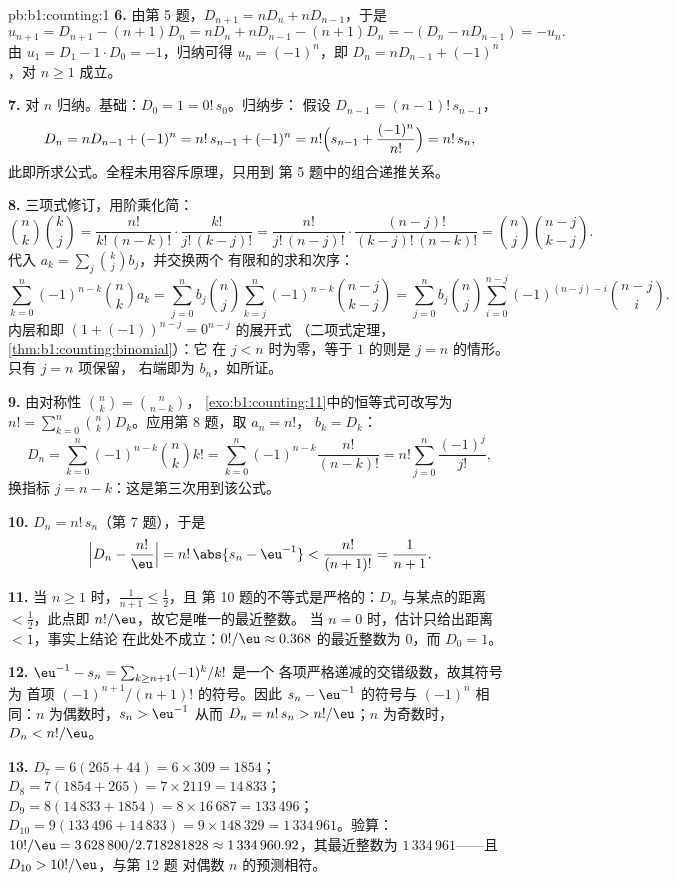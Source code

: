 \begin{solution}{pb:b1:counting:1}
\textbf{6.} 由第 5 题，$D_{n+1} = nD_n + nD_{n-1}$，于是
\[
u_{n+1} = D_{n+1} - (n+1)D_n = nD_n + nD_{n-1} - (n+1)D_n
= -(D_n - nD_{n-1}) = -u_n .
\]
由 $u_1 = D_1 - 1 \cdot D_0 = -1$，归纳可得 $u_n =
(-1)^n$，即 $D_n = nD_{n-1} + (-1)^n$，对 $n \geq 1$ 成立。

\textbf{7.} 对 $n$ 归纳。基础：$D_0 = 1 = 0!\,s_0$。归纳步：
假设 $D_{n-1} = (n-1)!\,s_{n-1}$，
\[
D_n = nD_{n-1} + (-1)^n = n!\,s_{n-1} + (-1)^n
= n!\Bigl(s_{n-1} + \frac{(-1)^n}{n!}\Bigr) = n!\,s_n ,
\]
此即所求公式。全程未用容斥原理，只用到
第 5 题中的组合递推关系。

\textbf{8.} 三项式修订，用阶乘化简：
\[
\binom nk \binom kj
= \frac{n!}{k!\,(n-k)!} \cdot \frac{k!}{j!\,(k-j)!}
= \frac{n!}{j!\,(n-j)!} \cdot \frac{(n-j)!}{(k-j)!\,(n-k)!}
= \binom nj \binom{n-j}{k-j} .
\]
代入 $a_k = \sum_j \binom kj b_j$，并交换两个
有限和的求和次序：
\[
\sum_{k=0}^{n} (-1)^{n-k} \binom nk a_k
= \sum_{j=0}^{n} b_j \binom nj
\sum_{k=j}^{n} (-1)^{n-k} \binom{n-j}{k-j}
= \sum_{j=0}^{n} b_j \binom nj
\sum_{i=0}^{n-j} (-1)^{(n-j)-i} \binom{n-j}{i} .
\]
内层和即 $(1 + (-1))^{n-j} = 0^{n-j}$ 的展开式
（二项式定理，\cref{thm:b1:counting:binomial}）：它
在 $j < n$ 时为零，等于 $1$ 的则是 $j = n$ 的情形。只有 $j = n$ 项保留，
右端即为 $b_n$，如所证。

\textbf{9.} 由对称性 $\binom nk = \binom n{n-k}$，
\cref{exo:b1:counting:11}中的恒等式可改写为 $n! =
\sum_{k=0}^n \binom nk D_k$。应用第 8 题，取 $a_n = n!$，
$b_k = D_k$：
\[
D_n = \sum_{k=0}^{n} (-1)^{n-k} \binom nk k!
= \sum_{k=0}^{n} (-1)^{n-k} \frac{n!}{(n-k)!}
= n! \sum_{j=0}^{n} \frac{(-1)^j}{j!} ,
\]
换指标 $j = n - k$：这是第三次用到该公式。

\textbf{10.} $D_n = n!\,s_n$（第 7 题），于是
\[
\Bigl| D_n - \frac{n!}{\eu} \Bigr|
= n!\,\abs{s_n - \eu^{-1}} < \frac{n!}{(n+1)!} = \frac1{n+1} .
\]

\textbf{11.} 当 $n \geq 1$ 时，$\frac1{n+1} \leq \frac12$，且
第 10 题的不等式是严格的：$D_n$ 与某点的距离
$< \frac12$，此点即 $n!/\eu$，故它是唯一的最近整数。
当 $n = 0$ 时，估计只给出距离 $< 1$，事实上结论
在此处不成立：$0!/\eu \approx 0.368$ 的最近整数为 $0$，而
$D_0 = 1$。

\textbf{12.} $\eu^{-1} - s_n = \sum_{k \geq n+1} (-1)^k/k!$ 是一个
各项严格递减的交错级数，故其符号为
首项 $(-1)^{n+1}/(n+1)!$ 的符号。因此 $s_n -
\eu^{-1}$ 的符号与 $(-1)^n$ 相同：$n$ 为偶数时，$s_n > \eu^{-1}$
从而 $D_n = n!\,s_n > n!/\eu$；$n$ 为奇数时，$D_n < n!/\eu$。

\textbf{13.} $D_7 = 6(265 + 44) = 6 \times 309 = 1854$；$D_8 =
7(1854 + 265) = 7 \times 2119 = 14\,833$；$D_9 = 8(14\,833 + 1854)
= 8 \times 16\,687 = 133\,496$；$D_{10} = 9(133\,496 + 14\,833) =
9 \times 148\,329 = 1\,334\,961$。验算：$10!/\eu = 3\,628\,800 /
2.718281828 \approx 1\,334\,960.92$，其最近整数为
$1\,334\,961$——且 $D_{10} > 10!/\eu$，与第 12 题
对偶数 $n$ 的预测相符。


\end{solution}
